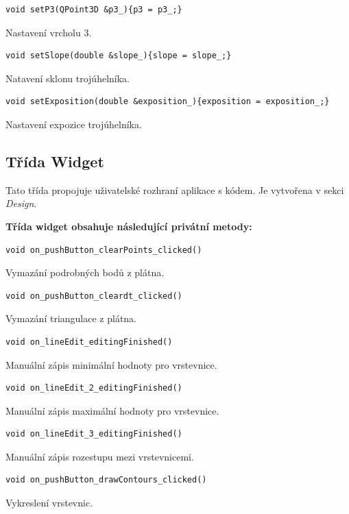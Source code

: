 \documentclass[a4paper, 12pt, oneside, titlepage]{article} %
\begin{document}
\begin{verbatim}
void setP3(QPoint3D &p3_){p3 = p3_;}
\end{verbatim}
Nastavení vrcholu 3.\\

\begin{verbatim}
void setSlope(double &slope_){slope = slope_;}
\end{verbatim}
Natavení sklonu trojúhelníka.\\

\begin{verbatim}
void setExposition(double &exposition_){exposition = exposition_;}
\end{verbatim}
Nastavení expozice trojúhelníka.\\


\subsection{Třída Widget}
Tato třída propojuje uživatelské rozhraní aplikace s kódem. Je vytvořena v sekci \emph{Design}.

\textbf{Třída widget obsahuje následující privátní metody:}
\begin{verbatim}
void on_pushButton_clearPoints_clicked()
\end{verbatim}
Vymazání podrobných bodů z plátna.\\

\begin{verbatim}
void on_pushButton_cleardt_clicked()
\end{verbatim}
Vymazání triangulace z plátna.\\

\begin{verbatim}
void on_lineEdit_editingFinished()
\end{verbatim}
Manuální zápis minimální hodnoty pro vrstevnice.\\

\begin{verbatim}
void on_lineEdit_2_editingFinished()
\end{verbatim}
Manuální zápis maximální hodnoty pro vrstevnice.\\

\begin{verbatim}
void on_lineEdit_3_editingFinished()
\end{verbatim}
Manuální zápis rozestupu mezi vrstevnicemi.\\

\begin{verbatim}
void on_pushButton_drawContours_clicked()
\end{verbatim}
Vykreslení vrstevnic.\\
\end{document}
